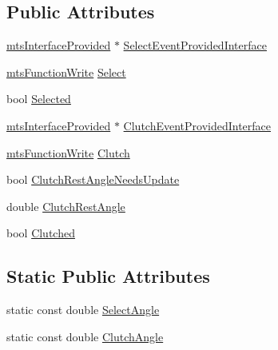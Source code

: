 \subsection*{Public Attributes}
\begin{DoxyCompactItemize}
\item 
\hyperlink{classmts_interface_provided}{mts\+Interface\+Provided} $\ast$ \hyperlink{classmts_intuitive_da_vinci_1_1_master_arm_data_ae0abfe69ca750c526f1e4b86bba2ac93}{Select\+Event\+Provided\+Interface}
\item 
\hyperlink{classmts_function_write}{mts\+Function\+Write} \hyperlink{classmts_intuitive_da_vinci_1_1_master_arm_data_a207b776ff47655c192af977ecdae64ca}{Select}
\item 
bool \hyperlink{classmts_intuitive_da_vinci_1_1_master_arm_data_a7e0c4a473c2ef763ab47513edb9dd8d8}{Selected}
\item 
\hyperlink{classmts_interface_provided}{mts\+Interface\+Provided} $\ast$ \hyperlink{classmts_intuitive_da_vinci_1_1_master_arm_data_acafce94f96ebf3bed4ab9e43e475054d}{Clutch\+Event\+Provided\+Interface}
\item 
\hyperlink{classmts_function_write}{mts\+Function\+Write} \hyperlink{classmts_intuitive_da_vinci_1_1_master_arm_data_a58792120331f67da36c3464363f8af74}{Clutch}
\item 
bool \hyperlink{classmts_intuitive_da_vinci_1_1_master_arm_data_a448d45cb9698ef91d19ba31742df8034}{Clutch\+Rest\+Angle\+Needs\+Update}
\item 
double \hyperlink{classmts_intuitive_da_vinci_1_1_master_arm_data_abbc2e4cac424cfc2faa487315e2dda65}{Clutch\+Rest\+Angle}
\item 
bool \hyperlink{classmts_intuitive_da_vinci_1_1_master_arm_data_a7f93e3793b9cb0cbd70ab1fba6f05342}{Clutched}
\end{DoxyCompactItemize}
\subsection*{Static Public Attributes}
\begin{DoxyCompactItemize}
\item 
static const double \hyperlink{classmts_intuitive_da_vinci_1_1_master_arm_data_af030ea2aa05d0a2b43cf2d68961a2601}{Select\+Angle}
\item 
static const double \hyperlink{classmts_intuitive_da_vinci_1_1_master_arm_data_a64ce985e23a0d56e77ea19d53d7e1148}{Clutch\+Angle}
\end{DoxyCompactItemize}


